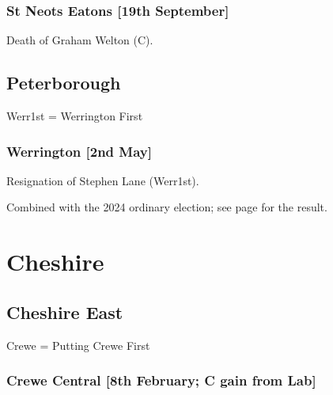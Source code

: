 \documentclass[a4paper,openany]{book}
\begin{document}
\begin{resultsiii}
\subsubsection*{St Neots Eatons \hspace*{\fill}\nolinebreak[1]%
	\enspace\hspace*{\fill}
	[19th September]}


Death of Graham Welton (C).

\subsection*{Peterborough}

Werr1st = Werrington First

\subsubsection*{Werrington \hspace*{\fill}\nolinebreak[1]%
	\enspace\hspace*{\fill}
	[2nd May]}


Resignation of Stephen Lane (Werr1st).

Combined with the 2024 ordinary election; see page \pageref{WerringtonPeterborough} for the result.

\section{Cheshire}

\subsection*{Cheshire East}

Crewe = Putting Crewe First

\subsubsection*{Crewe Central \hspace*{\fill}\nolinebreak[1]%
	\enspace\hspace*{\fill}
	[8th February; C gain from Lab]}



\end{resultsiii}
\end{document}
